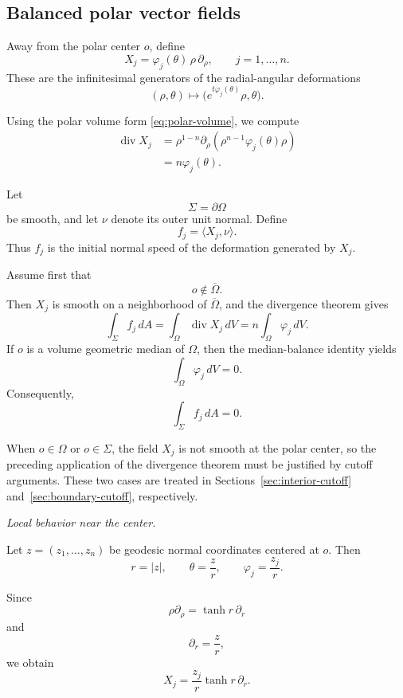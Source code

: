 \documentclass[11pt,reqno]{amsart}
\numberwithin{equation}{section}
\theoremstyle{definition}
\theoremstyle{remark}
\newcommand{\diver}{\operatorname{div}}
\newcommand{\ithead}[1]{%
  \par\medskip\noindent\textit{#1}\enspace
}
\begin{document}
\subsection{Balanced polar vector fields}

Away from the polar center \(o\), define
\[
X_j
=
\varphi_j(\theta)\,\rho\,\partial_\rho,
\qquad
j=1,\ldots,n.
\]
These are the infinitesimal generators of the radial-angular deformations
\[
(\rho,\theta)
\longmapsto
\bigl(e^{t\varphi_j(\theta)}\rho,\theta\bigr).
\]

Using the polar volume form \eqref{eq:polar-volume}, we compute
\[
\begin{aligned}
\diver X_j
&=
\rho^{1-n}
\partial_\rho
\left(
\rho^{n-1}\varphi_j(\theta)\rho
\right)
\\
&=
n\varphi_j(\theta).
\end{aligned}
\]

Let
\[
\Sigma=\partial\Omega
\]
be smooth, and let \(\nu\) denote its outer unit normal. Define
\[
f_j
=
\langle X_j,\nu\rangle.
\]
Thus \(f_j\) is the initial normal speed of the deformation generated by
\(X_j\).

Assume first that
\[
o\notin\overline{\Omega}.
\]
Then \(X_j\) is smooth on a neighborhood of \(\overline{\Omega}\), and the
divergence theorem gives
\[
\int_\Sigma f_j\,dA
=
\int_\Omega \diver X_j\,dV
=
n\int_\Omega\varphi_j\,dV.
\]
If \(o\) is a volume geometric median of \(\Omega\), then the median-balance
identity yields
\[
\int_\Omega\varphi_j\,dV=0.
\]
Consequently,
\begin{equation}
\int_\Sigma f_j\,dA=0.
\label{eq:fj-mean-zero-direct}
\end{equation}

When \(o\in\Omega\) or \(o\in\Sigma\), the field \(X_j\) is not smooth at
the polar center, so the preceding application of the divergence theorem
must be justified by cutoff arguments. These two cases are treated in
Sections~\ref{sec:interior-cutoff} and~\ref{sec:boundary-cutoff},
respectively.
\ithead{Local behavior near the center.}

Let \(z=(z_1,\dots,z_n)\) be geodesic normal coordinates centered at \(o\).
Then
\[
r=|z|,
\qquad
\theta=\frac{z}{r},
\qquad
\varphi_j=\frac{z_j}{r}.
\]

Since
\[
\rho\partial_\rho
=
\tanh r\,\partial_r
\]
and
\[
\partial_r
=
\frac{z}{r},
\]
we obtain
\[
X_j
=
\frac{z_j}{r}\tanh r\,\partial_r.
\]
\end{document}
